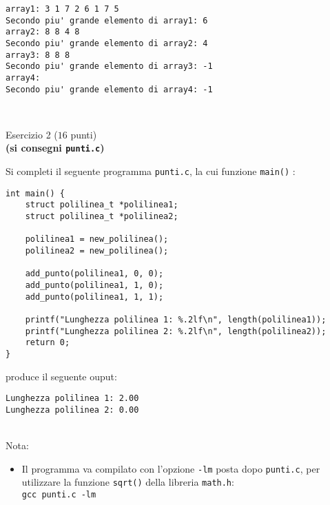 \documentclass[12pt]{article}
\begin{document}
\begin{mdframed}[backgroundcolor=lightgrey] 
\begin{verbatim}
array1: 3 1 7 2 6 1 7 5 
Secondo piu' grande elemento di array1: 6
array2: 8 8 4 8 
Secondo piu' grande elemento di array2: 4
array3: 8 8 8 
Secondo piu' grande elemento di array3: -1
array4: 
Secondo piu' grande elemento di array4: -1
\end{verbatim}
\end{mdframed}

\mbox{}\\
\begin{center}{\Large Esercizio 2} ($16$ punti)\\
  \textbf{(si consegni \texttt{punti.c})}\end{center}
Si completi il seguente programma \texttt{punti.c}, la cui funzione \texttt{main()} :
\begin{center}
\begin{lstlisting}[language=myC]
int main() {
    struct polilinea_t *polilinea1;
    struct polilinea_t *polilinea2;

    polilinea1 = new_polilinea();
    polilinea2 = new_polilinea();

    add_punto(polilinea1, 0, 0);
    add_punto(polilinea1, 1, 0);
    add_punto(polilinea1, 1, 1);

    printf("Lunghezza polilinea 1: %.2lf\n", length(polilinea1));
    printf("Lunghezza polilinea 2: %.2lf\n", length(polilinea2));
    return 0;
}
\end{lstlisting}
\end{center}
produce il seguente ouput:
\begin{mdframed}[backgroundcolor=lightgrey] 
\begin{verbatim}
Lunghezza polilinea 1: 2.00
Lunghezza polilinea 2: 0.00
\end{verbatim}
\end{mdframed}

\mbox{}\\
Nota:
\begin{itemize}
\item Il programma va compilato con l'opzione \texttt{-lm} posta dopo \texttt{punti.c}, per utilizzare la funzione \texttt{sqrt()} della libreria \texttt{math.h}:\\
 \texttt{gcc punti.c -lm}
\end{itemize}
\end{document}
